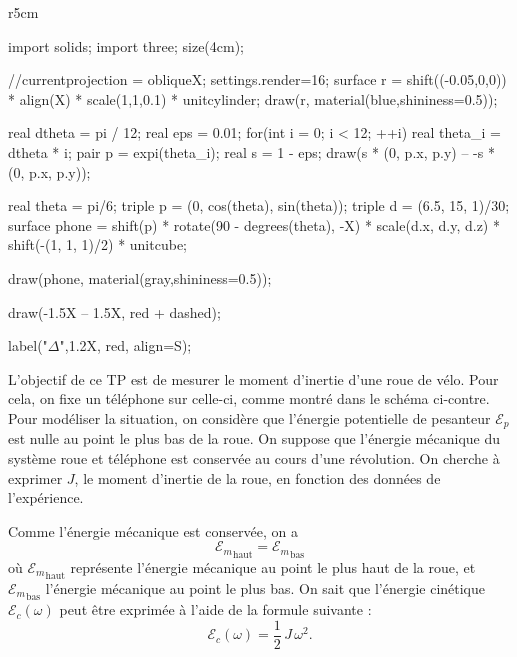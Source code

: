 \documentclass[a4paper]{report}
\begin{document}
	\begin{wrapfigure}{r}{5cm}
		\centering
		\begin{asy}
			import solids;
			import three;
			size(4cm);

			//currentprojection = obliqueX;
			settings.render=16;
			surface r = shift((-0.05,0,0)) * align(X) * scale(1,1,0.1) * unitcylinder;
			draw(r, material(blue,shininess=0.5));

			real dtheta = pi / 12;
			real eps = 0.01;
			for(int i = 0; i < 12; ++i) {
				real theta_i = dtheta * i;
				pair p = expi(theta_i);
				real s = 1 - eps;
				draw(s * (0, p.x, p.y) -- -s * (0, p.x, p.y));
			}

			real theta = pi/6;
			triple p = (0, cos(theta), sin(theta));
			triple d = (6.5, 15, 1)/30;
			surface phone = shift(p) * rotate(90 - degrees(theta), -X) * scale(d.x, d.y, d.z) * shift(-(1, 1, 1)/2) * unitcube;

			draw(phone, material(gray,shininess=0.5));

			draw(-1.5X -- 1.5X, red + dashed);

			label("$\Delta$",1.2X, red, align=S);
		\end{asy}
	\end{wrapfigure}
	L'objectif de ce TP est de mesurer le moment d'inertie d'une roue de vélo. Pour cela, on fixe un téléphone sur celle-ci, comme montré dans le schéma ci-contre. Pour modéliser la situation, on considère que l'énergie potentielle de pesanteur $\mathcal{E}_p$ est nulle au point le plus bas de la roue. On suppose que l'énergie mécanique du système roue et téléphone est conservée au cours d'une révolution. On cherche à exprimer $J$, le moment d'inertie de la roue, en fonction des données de l'expérience.

	Comme l'énergie mécanique est conservée, on a \[
		{\mathcal{E}_m}_{\text{haut}} = {\mathcal{E}_m}_{\text{bas}}
	\] où ${\mathcal{E}_m}_{\text{haut}}$ représente l'énergie mécanique au point le plus haut de la roue, et ${\mathcal{E}_m}_{\text{bas}}$ l'énergie mécanique au point le plus bas. On sait que l'énergie cinétique $\mathcal{E}_c(\omega)$ peut être exprimée à l'aide de la formule suivante : \[
		\mathcal{E}_c(\omega) = \frac{1}{2}\, J\, \omega^2.
	\]
	
\end{document}
